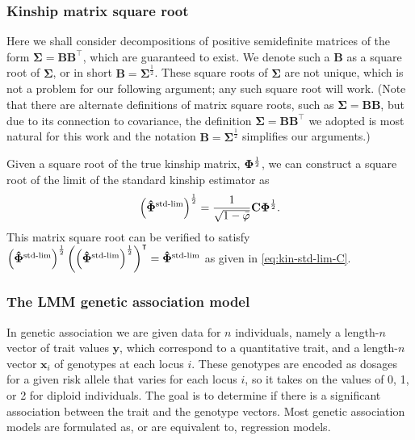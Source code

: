 \documentclass[11pt]{article}
\newcommand{\kinMat}{%
  \ensuremath{%
    \mathbf{\Phi}
  }%
  \xspace%
}%
\newcommand{\kinMatEstNamed}[1]{%
  \ensuremath{%
    \mathbf{\hat{\Phi}}^\text{#1}
  }%
  \xspace%
}%
\newcommand{\kinMatStdLim}{%
  \kinMatEstNamed{std-lim}
}%
\begin{document}
\subsubsection{Kinship matrix square root}


Here we shall consider decompositions of positive semidefinite matrices of the form $\mathbf{\Sigma} = \mathbf{B} \mathbf{B}^\intercal$, which are guaranteed to exist.
We denote such a $\mathbf{B}$ as a square root of $\mathbf{\Sigma}$, or in short $\mathbf{B} = \mathbf{\Sigma}^\frac{1}{2}$.
These square roots of $\mathbf{\Sigma}$ are not unique, which is not a problem for our following argument; any such square root will work.
(Note that there are alternate definitions of matrix square roots, such as $\mathbf{\Sigma} = \mathbf{B} \mathbf{B}$, but due to its connection to covariance, the definition $\mathbf{\Sigma} = \mathbf{B} \mathbf{B}^\intercal$ we adopted is most natural for this work and the notation $\mathbf{B} = \mathbf{\Sigma}^\frac{1}{2}$ simplifies our arguments.)

Given a square root of the true kinship matrix, $\kinMat^\frac{1}{2}$, we can construct a square root of the limit of the standard kinship estimator as
\begin{equation}
  \label{eq:eq:kin-std-lim-C-sqrt}
  \left( \kinMatStdLim \right)^\frac{1}{2}
  =
  \frac{1}{ \sqrt{ 1 - \bar{\varphi} } }
  \mathbf{C} \kinMat^\frac{1}{2}
  .
\end{equation}
This matrix square root can be verified to satisfy
$\left( \kinMatStdLim \right)^\frac{1}{2} \left( \left( \kinMatStdLim \right)^\frac{1}{2} \right)^\intercal = \kinMatStdLim$
as given in \cref{eq:kin-std-lim-C}.

\subsubsection{The LMM genetic association model}

In genetic association we are given data for $n$ individuals, namely a length-$n$ vector of trait values $\mathbf{y}$, which correspond to a quantitative trait, and a length-$n$ vector $\mathbf{x}_i$ of genotypes at each locus $i$.
These genotypes are encoded as dosages for a given risk allele that varies for each locus $i$, so it takes on the values of 0, 1, or 2 for diploid individuals.
The goal is to determine if there is a significant association between the trait and the genotype vectors.
Most genetic association models are formulated as, or are equivalent to, regression models.
\end{document}
